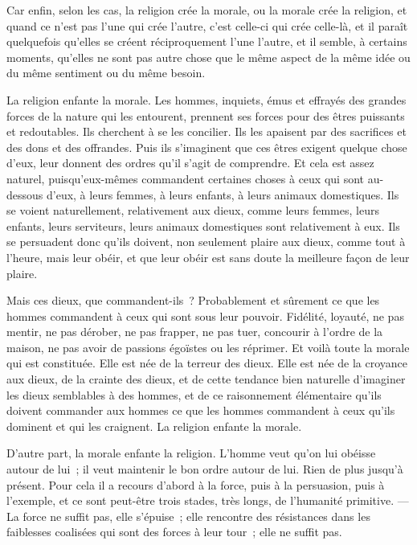 \documentclass[french,twoside]{book} %
\begin{document}
Car enfin, selon les cas, la religion crée la morale, ou la morale crée la religion, et quand ce n’est pas l’une qui crée l’autre, c’est celle-ci qui crée celle-là,  et il paraît quelquefois qu’elles se créent réciproquement l’une l’autre, et il semble, à certains moments, qu’elles ne sont pas autre chose que le même aspect de la même idée ou du même sentiment ou du même besoin.\par
La religion enfante la morale. Les hommes, inquiets, émus et effrayés des grandes forces de la nature qui les entourent, prennent ses forces pour des êtres puissants et redoutables. Ils cherchent à se les concilier. Ils les apaisent par des sacrifices et des dons et des offrandes. Puis ils s’imaginent que ces êtres exigent quelque chose d’eux, leur donnent des ordres qu’il s’agit de comprendre. Et cela est assez naturel, puisqu’eux-mêmes commandent certaines choses à ceux qui sont au-dessous d’eux, à leurs femmes, à leurs enfants, à leurs animaux domestiques. Ils se voient naturellement, relativement aux dieux, comme leurs femmes, leurs enfants, leurs serviteurs, leurs animaux domestiques sont relativement à eux. Ils se persuadent donc qu’ils doivent, non seulement plaire aux dieux, comme tout à l’heure, mais leur obéir, et que leur obéir est sans doute la meilleure façon de leur plaire.\par
Mais ces dieux, que commandent-ils ? Probablement et sûrement ce que les hommes commandent à ceux qui sont sous leur pouvoir. Fidélité, loyauté,  ne pas mentir, ne pas dérober, ne pas frapper, ne pas tuer, concourir à l’ordre de la maison, ne pas avoir de passions égoïstes ou les réprimer. Et voilà toute la morale qui est constituée. Elle est née de la terreur des dieux. Elle est née de la croyance aux dieux, de la crainte des dieux, et de cette tendance bien naturelle d’imaginer les dieux semblables à des hommes, et de ce raisonnement élémentaire qu’ils doivent commander aux hommes ce que les hommes commandent à ceux qu’ils dominent et qui les craignent. La religion enfante la morale.\par
D’autre part, la morale enfante la religion. L’homme veut qu’on lui obéisse autour de lui ; il veut maintenir le bon ordre autour de lui. Rien de plus jusqu’à présent. Pour cela il a recours d’abord à la force, puis à la persuasion, puis à l’exemple, et ce sont peut-être trois stades, très longs, de l’humanité primitive. — La force ne suffit pas, elle s’épuise ; elle rencontre des résistances dans les faiblesses coalisées qui sont des forces à leur tour ; elle ne suffit pas.\par
\end{document}

